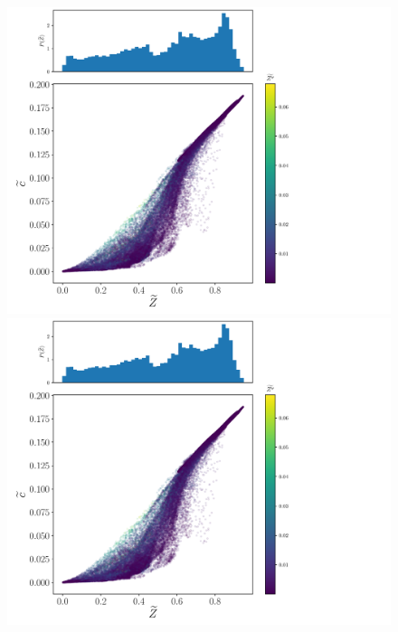 \documentclass[xcolor=dvipsnames]{beamer}
\begin{document}
{\begin{figure}[!tbp]
    \includegraphics[page=2, height=0.3\textwidth, trim=1.0cm 0cm 2.4cm 0cm, clip]{./figs/inputs_dice_0009.pdf}%
    \includegraphics[page=3, height=0.3\textwidth, trim=0.0cm 0cm 2.4cm 0cm, clip]{./figs/inputs_dice_0009.pdf}%
  \end{figure}%
}
\end{document}
